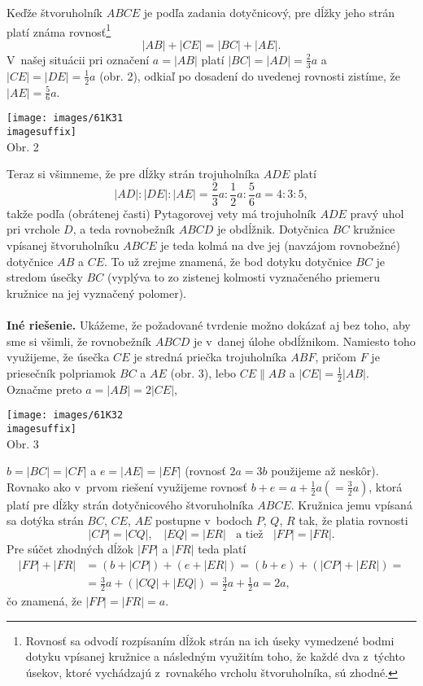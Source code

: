 \rieh Keďže štvoruholník $ABCE$ je podľa zadania dotyčnicový, pre dĺžky jeho strán platí známa rovnosť\footnote{Rovnosť sa odvodí rozpísaním dĺžok strán na ich úseky vymedzené bodmi dotyku vpísanej kružnice a následným využitím toho, že každé dva z~týchto úsekov, ktoré vychádzajú z~rovnakého vrcholu
štvoruholníka, sú zhodné.}
$$|AB| + |CE| = |BC| + |AE|.$$
V~našej situácii pri označení $a = |AB|$ platí $|BC| = |AD| = \frac{2}{3}a$ a $|CE| = |DE| =\frac{1}{2}a$
(obr. 2), odkiaľ po dosadení do uvedenej rovnosti zistíme, že $|AE| = \frac{5}{6}a$.
\begin{center}
\texttt{[image: images/61K31\\imagesuffix]}\\

Obr. 2
\end{center}
Teraz si všimneme, že pre dĺžky strán trojuholníka $ADE$ platí
$$|AD| : |DE| : |AE| = \frac{2}{3}a : \frac{1}{2}a : \frac{5}{6}a = 4 : 3 : 5,$$
takže podľa (obrátenej časti) Pytagorovej vety má trojuholník $ADE$ pravý uhol pri vrchole $D$, a teda rovnobežník $ABCD$ je obdĺžnik. Dotyčnica $BC$ kružnice vpísanej štvoruholníku $ABCE$ je teda kolmá na dve jej (navzájom rovnobežné) dotyčnice $AB$ a $CE$. To už zrejme znamená, že bod dotyku dotyčnice $BC$ je stredom úsečky $BC$ (vyplýva to zo zistenej kolmosti vyznačeného priemeru kružnice na jej vyznačený
polomer).\\
\\
\textbf{Iné riešenie.} Ukážeme, že požadované tvrdenie možno dokázať aj bez toho, aby sme si všimli, že rovnobežník $ABCD$ je v~danej úlohe obdĺžnikom. Namiesto toho využijeme, že úsečka $CE$ je stredná priečka trojuholníka $ABF$, pričom $F$ je priesečník polpriamok $BC$ a $AE$ (obr. 3), lebo $CE \parallel AB$ a $|CE| =\frac{1}{2}|AB|$. Označme preto $a = |AB| = 2|CE|$,
\begin{center}
\texttt{[image: images/61K32\\imagesuffix]}\\

Obr. 3
\end{center}
$b = |BC| = |CF|$ a $e = |AE| = |EF|$ (rovnosť $2a = 3b$ použijeme až neskôr). Rovnako ako v~prvom riešení využijeme rovnosť $b+e = a+\frac{1}{2}a (=\frac{3}{2}a)$, ktorá platí pre dĺžky strán dotyčnicového štvoruholníka $ABCE$. Kružnica jemu vpísaná sa dotýka strán $BC$, $CE$, $AE$ postupne v~bodoch $P$, $Q$, $R$ tak, že platia rovnosti
$$|CP| = |CQ|, \ \ \ \ |EQ| = |ER| \ \ \ \ \text{a tiež}\ \ \ \ |FP| = |FR|.$$
Pre súčet zhodných dĺžok $|FP|$ a $|FR|$ teda platí
\begin{align*}
|FP| + |FR| &= (b + |CP|) + (e + |ER|) = (b + e) + (|CP| + |ER|) =\\
&=\frac{3}{2}a + (|CQ| + |EQ|) = \frac{3}{2}a + \frac{1}{2}a = 2a,
\end{align*}
čo znamená, že $|FP| = |FR| = a$.


